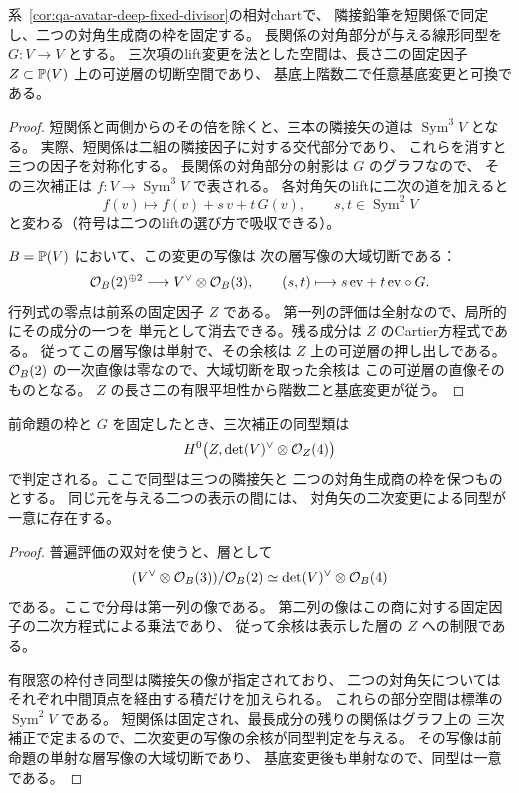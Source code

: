 \begin{proposition}[対角矢のlift変更を法とする境界の三次関係]
\label{prop:qa-avatar-deep-cubic-correction}
系~\ref{cor:qa-avatar-deep-fixed-divisor}の相対chartで、
隣接鉛筆を短関係で同定し、二つの対角生成商の枠を固定する。
長関係の対角部分が与える線形同型を $G:V\to V$ とする。
三次項のlift変更を法とした空間は、長さ二の固定因子
$Z\subset\mathbb P(V)$ 上の可逆層の切断空間であり、
基底上階数二で任意基底変更と可換である。
\end{proposition}
\begin{proof}
短関係と両側からのその倍を除くと、三本の隣接矢の道は
$\operatorname{Sym}^3V$ となる。
実際、短関係は二組の隣接因子に対する交代部分であり、
これらを消すと三つの因子を対称化する。
長関係の対角部分の射影は $G$ のグラフなので、
その三次補正は $f:V\to\operatorname{Sym}^3V$ で表される。
各対角矢のliftに二次の道を加えると
\[
 f(v)\longmapsto f(v)+s\,v+t\,G(v),
 \qquad s,t\in\operatorname{Sym}^2V
\]
と変わる（符号は二つのliftの選び方で吸収できる）。

$B=\mathbb P(V)$ において、この変更の写像は
次の層写像の大域切断である：
\[
 \mathcal O_B(2)^{\oplus2}\longrightarrow V^\vee\otimes\mathcal O_B(3),
 \qquad (s,t)\longmapsto s\,\mathrm{ev}+t\,\mathrm{ev}\circ G.
\]
行列式の零点は前系の固定因子 $Z$ である。
第一列の評価は全射なので、局所的にその成分の一つを
単元として消去できる。残る成分は $Z$ のCartier方程式である。
従ってこの層写像は単射で、その余核は
$Z$ 上の可逆層の押し出しである。
$\mathcal O_B(2)$ の一次直像は零なので、大域切断を取った余核は
この可逆層の直像そのものとなる。
$Z$ の長さ二の有限平坦性から階数二と基底変更が従う。
\end{proof}

\begin{corollary}[境界の枠付き有限窓の同型判定]
\label{cor:qa-avatar-framed-deep-isom}
前命題の枠と $G$ を固定したとき、三次補正の同型類は
\[
 H^0\bigl(Z,\det(V)^\vee\otimes\mathcal O_Z(4)\bigr)
\]
で判定される。ここで同型は三つの隣接矢と
二つの対角生成商の枠を保つものとする。
同じ元を与える二つの表示の間には、
対角矢の二次変更による同型が一意に存在する。
\end{corollary}
\begin{proof}
普遍評価の双対を使うと、層として
\[
 (V^\vee\otimes\mathcal O_B(3))/\mathcal O_B(2)
       \simeq \det(V)^\vee\otimes\mathcal O_B(4)
\]
である。ここで分母は第一列の像である。
第二列の像はこの商に対する固定因子の二次方程式による乗法であり、
従って余核は表示した層の $Z$ への制限である。

有限窓の枠付き同型は隣接矢の像が指定されており、
二つの対角矢についてはそれぞれ中間頂点を経由する積だけを加えられる。
これらの部分空間は標準の $\operatorname{Sym}^2V$ である。
短関係は固定され、最長成分の残りの関係はグラフ上の
三次補正で定まるので、二次変更の写像の余核が同型判定を与える。
その写像は前命題の単射な層写像の大域切断であり、
基底変更後も単射なので、同型は一意である。
\end{proof}

